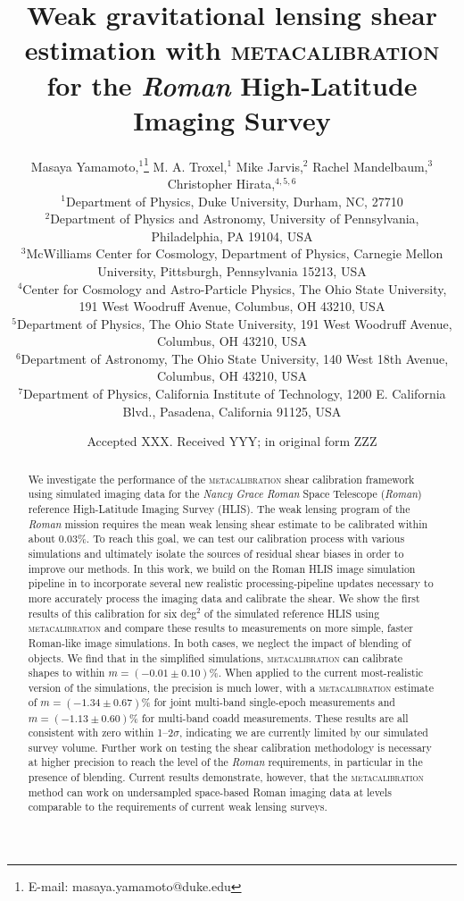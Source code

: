 \documentclass[fleqn,usenatbib]{mnras}
\title[Metacalibration for the Roman High-Latitude Imaging Survey]{Weak gravitational lensing shear estimation with \textsc{metacalibration} for the \emph{Roman} High-Latitude Imaging Survey}
\author[M. Yamamoto et al.]{
Masaya Yamamoto,$^{1}$\thanks{E-mail: masaya.yamamoto@duke.edu}
M. A. Troxel,$^{1}$
Mike Jarvis,$^{2}$
Rachel Mandelbaum,$^{3}$
Christopher Hirata,$^{4,5,6}$
\newauthor{
Heyang Long,$^{4,5}$ Ami Choi,$^{7}$
Tianqing Zhang,$^{3}$}\\
$^{1}$Department of Physics, Duke University, Durham, NC, 27710\\
$^{2}$Department of Physics and Astronomy, University of Pennsylvania, Philadelphia, PA 19104, USA\\
$^{3}$McWilliams Center for Cosmology, Department of Physics, Carnegie Mellon University, Pittsburgh, Pennsylvania 15213, USA\\
$^{4}$Center for Cosmology and Astro-Particle Physics, The Ohio State University, 191 West Woodruff Avenue, Columbus, OH 43210, USA\\
$^{5}$Department of Physics, The Ohio State University, 191 West Woodruff Avenue, Columbus, OH 43210, USA\\
$^{6}$Department of Astronomy, The Ohio State University, 140 West 18th Avenue, Columbus, OH 43210, USA\\
$^{7}$Department of Physics, California Institute of Technology, 1200 E. California Blvd., Pasadena, California 91125, USA\\
}
\date{Accepted XXX. Received YYY; in original form ZZZ}
\begin{document}
\label{firstpage}
\pagerange{\pageref{firstpage}--\pageref{lastpage}}
\maketitle

\begin{abstract}
We investigate the performance of the \textsc{metacalibration} shear calibration framework using simulated imaging data for the \emph{Nancy Grace Roman} Space Telescope (\emph{Roman}) reference High-Latitude Imaging Survey (HLIS).
The weak lensing program of the \emph{Roman} mission requires the mean weak lensing shear estimate to be calibrated within about 0.03\%. To reach this goal, we can test our calibration process with various simulations and ultimately isolate the sources of residual shear biases in order to improve our methods. In this work, we build on the Roman HLIS image simulation pipeline in \cite{2021MNRAS.501.2044T} to incorporate several new realistic processing-pipeline updates necessary to more accurately process the imaging data and calibrate the shear. We show the first results of this calibration for six \textrm{deg}$^{2}$ of the simulated reference HLIS using \textsc{metacalibration} and compare these results to measurements on more simple, faster Roman-like image simulations. In both cases, we neglect the impact of blending of objects. We find that in the simplified simulations, \textsc{metacalibration} can calibrate shapes to within $m=(-0.01\pm 0.10)$\%. When applied to the current most-realistic version of the simulations, the precision is much lower, with a \textsc{metacalibration} estimate of $m=(-1.34\pm 0.67)$\% for joint multi-band single-epoch measurements and $m=(-1.13\pm 0.60)$\% for multi-band coadd measurements. These results are all consistent with zero within 1--2$\sigma$, indicating we are currently limited by our simulated survey volume. Further work on testing the shear calibration methodology is necessary at higher precision to reach the level of the \textit{Roman} requirements, in particular in the presence of blending. 
Current results demonstrate, however, that the \textsc{metacalibration} method can work on undersampled space-based Roman imaging data at levels comparable to the requirements of current weak lensing surveys.
\end{abstract}
\end{document}
